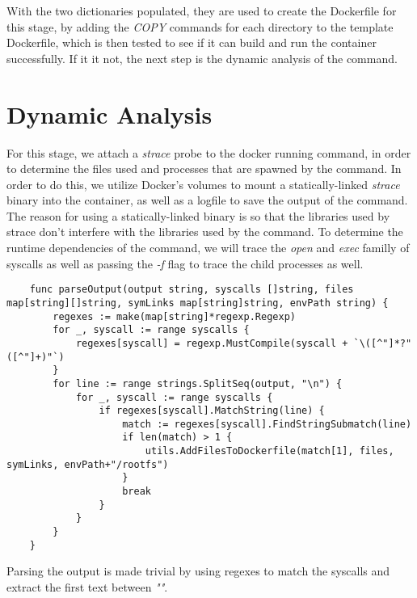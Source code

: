 With the two dictionaries populated, they are used to create the Dockerfile for this stage, by adding the \textit{COPY} commands for each directory to 
the template Dockerfile, which is then tested to see if it can build and run the container successfully. If it it not, the next step is the dynamic analysis of the command.

\section{Dynamic Analysis}


For this stage, we attach a \textit{strace} probe to the docker running command, in order to determine the files used and processes that are spawned by the command.
In order to do this, we utilize Docker's volumes to mount a statically-linked \textit{strace} binary into the container, as well as a logfile to save the output of the command.
The reason for using a statically-linked binary is so that the libraries used by strace don't interfere with the libraries used by the command.
To determine the runtime dependencies of the command, we will trace the \textit{open} and \textit{exec} familly of syscalls \cite{identify-dependencies} as well as passing the \textit{-f} flag
to trace the child processes as well.

\lstset{language=Go,caption=File util functions,label=lst:file-functions}
\begin{lstlisting}
    func parseOutput(output string, syscalls []string, files map[string][]string, symLinks map[string]string, envPath string) {
        regexes := make(map[string]*regexp.Regexp)
        for _, syscall := range syscalls {
            regexes[syscall] = regexp.MustCompile(syscall + `\([^"]*?"([^"]+)"`)
        }
        for line := range strings.SplitSeq(output, "\n") {
            for _, syscall := range syscalls {
                if regexes[syscall].MatchString(line) {
                    match := regexes[syscall].FindStringSubmatch(line)
                    if len(match) > 1 {
                        utils.AddFilesToDockerfile(match[1], files, symLinks, envPath+"/rootfs")
                    }
                    break
                }
            }
        }
    }
\end{lstlisting}

Parsing the output is made trivial by using regexes to match the syscalls and extract the first text between \textit{""}.

